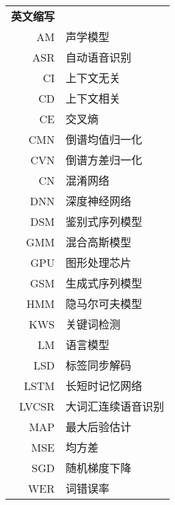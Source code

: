 \begin{longtable}{rl}
\textbf{英文缩写} \\
AM & 声学模型 \\
ASR & 自动语音识别 \\
CI & 上下文无关 \\
CD & 上下文相关 \\
CE & 交叉熵 \\
CMN & 倒谱均值归一化 \\
CVN & 倒谱方差归一化 \\
CN & 混淆网络 \\
DNN & 深度神经网络 \\
DSM & 鉴别式序列模型 \\
GMM & 混合高斯模型 \\
GPU & 图形处理芯片 \\
GSM & 生成式序列模型 \\
HMM & 隐马尔可夫模型 \\
KWS & 关键词检测 \\
LM & 语言模型 \\
LSD & 标签同步解码 \\
LSTM & 长短时记忆网络 \\
LVCSR & 大词汇连续语音识别 \\
MAP & 最大后验估计 \\
MSE & 均方差 \\
SGD & 随机梯度下降 \\
WER & 词错误率 \\
\end{longtable}
